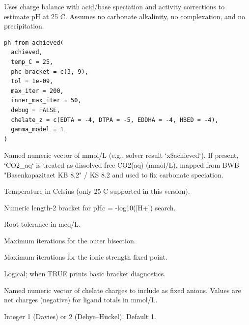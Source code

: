 \documentclass[a4paper]{book}
\begin{document}
%
\begin{Description}
Uses charge balance with acid/base speciation and activity corrections
to estimate pH at 25 C. Assumes no carbonate alkalinity, no complexation, and
no precipitation.
\end{Description}
%
\begin{Usage}
\begin{verbatim}
ph_from_achieved(
  achieved,
  temp_C = 25,
  phc_bracket = c(3, 9),
  tol = 1e-09,
  max_iter = 200,
  inner_max_iter = 50,
  debug = FALSE,
  chelate_z = c(EDTA = -4, DTPA = -5, EDDHA = -4, HBED = -4),
  gamma_model = 1
)
\end{verbatim}
\end{Usage}
%
\begin{Arguments}
\begin{ldescription}
\item[\code{achieved}] Named numeric vector of mmol/L (e.g., solver result `x\$achieved`).
If present, `CO2\_aq` is treated as dissolved free CO2(aq) (mmol/L), mapped
from BWB "Basenkapazitaet KB 8,2" / KS 8.2 and used to fix carbonate speciation.

\item[\code{temp\_C}] Temperature in Celsius (only 25 C supported in this version).

\item[\code{phc\_bracket}] Numeric length-2 bracket for pHc = -log10([H+]) search.

\item[\code{tol}] Root tolerance in meq/L.

\item[\code{max\_iter}] Maximum iterations for the outer bisection.

\item[\code{inner\_max\_iter}] Maximum iterations for the ionic strength fixed point.

\item[\code{debug}] Logical; when TRUE prints basic bracket diagnostics.

\item[\code{chelate\_z}] Named numeric vector of chelate charges to include as fixed
anions. Values are net charges (negative) for ligand totals in mmol/L.

\item[\code{gamma\_model}] Integer 1 (Davies) or 2 (Debye–Hückel). Default 1.
\end{ldescription}
\end{Arguments}
\end{document}

